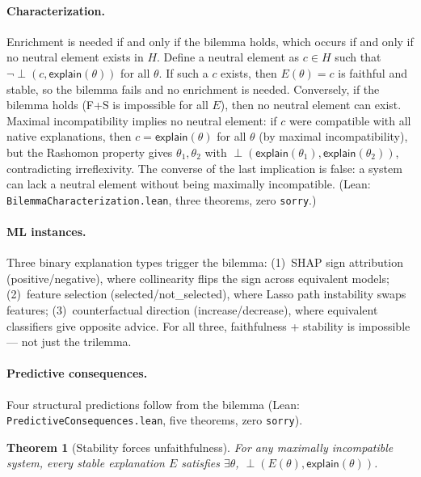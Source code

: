 \documentclass[11pt,a4paper]{article}
\newtheorem{theorem}{Theorem}[section]
\newcommand{\incomp}{\perp}
\begin{document}
\paragraph{Characterization.}
Enrichment is needed if and only if the bilemma holds, which occurs if and only if no neutral element exists in $H$.  Define a neutral element as $c \in H$ such that $\lnot\incomp(c, \mathsf{explain}(\theta))$ for all $\theta$.  If such a $c$ exists, then $E(\theta) = c$ is faithful and stable, so the bilemma fails and no enrichment is needed.  Conversely, if the bilemma holds (F+S is impossible for all $E$), then no neutral element can exist.  Maximal incompatibility implies no neutral element: if $c$ were compatible with all native explanations, then $c = \mathsf{explain}(\theta)$ for all $\theta$ (by maximal incompatibility), but the Rashomon property gives $\theta_1, \theta_2$ with $\incomp(\mathsf{explain}(\theta_1), \mathsf{explain}(\theta_2))$, contradicting irreflexivity.  The converse of the last implication is false: a system can lack a neutral element without being maximally incompatible.  (Lean: \texttt{BilemmaCharacterization.lean}, three theorems, zero \texttt{sorry}.)

\paragraph{ML instances.}
Three binary explanation types trigger the bilemma:
(1)~SHAP sign attribution (positive/negative), where collinearity flips the sign across equivalent models;
(2)~feature selection (selected/not\_selected), where Lasso path instability swaps features;
(3)~counterfactual direction (increase/decrease), where equivalent classifiers give opposite advice.
For all three, faithfulness + stability is impossible --- not just the trilemma.

\paragraph{Predictive consequences.}
Four structural predictions follow from the bilemma (Lean: \texttt{PredictiveConsequences.lean}, five theorems, zero \texttt{sorry}).

\begin{theorem}[Stability forces unfaithfulness]
\label{thm:stable-implies-unfaithful}
For any maximally incompatible system, every stable explanation $E$ satisfies $\exists \theta$, $\incomp(E(\theta), \mathsf{explain}(\theta))$.
\end{theorem}
\end{document}

